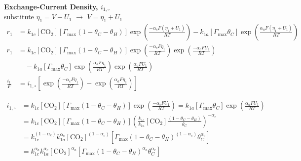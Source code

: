 \documentclass[12pt]{article}
\begin{document}
  \textbf{Exchange-Current Density, $i_{1,\circ}$} \\
  substitute $ \eta_1 = V - U_1$ $\rightarrow$ $ V = \eta_1 + U_1$
  \begin{equation*}
  \begin{split}
    r_1 &= k_{1c} [{\text{CO}_2}] \left[\Gamma_{\max} (1 - \theta_C - \theta_H) \right] \exp{ \left( \frac{-\alpha_c F (\eta_1 + U_1)}{RT} \right)}
    - k_{1a} \left[\Gamma_{\max} \theta_C \right] \exp{\left( \frac{\alpha_a F (\eta_1 + U_1)}{RT} \right)}
    \\
    r_1 &= k_{1c} [{\text{CO}_2}] \left[\Gamma_{\max} (1 - \theta_C - \theta_H) \right] \exp{ \left( \frac{-\alpha_c F \eta_1}{RT} \right)} \exp{ \left( \frac{-\alpha_c F U_1}{RT} \right)} \\
    & \quad - k_{1a} \left[\Gamma_{\max} \theta_C \right] \exp{\left( \frac{\alpha_a F \eta_1}{RT} \right)} \exp{\left( \frac{\alpha_a F U_1}{RT} \right)}
    \\
    \frac{i_1}{F} &= i_{1,\circ} \left[ \exp{\left( \frac{-\alpha_c F \eta_1}{RT} \right)} -\exp{\left( \frac{\alpha_a F \eta_1}{RT} \right)}  \right]
  \end{split}
  \end{equation*}

  \begin{equation*}
  \begin{split}
    i_{1,\circ} &= k_{1c} [{\text{CO}_2}] \left[\Gamma_{\max} (1 - \theta_C - \theta_H) \right] \exp{ \left( \frac{-\alpha_c F U_1}{RT} \right)}
    = k_{1a} \left[\Gamma_{\max} \theta_C \right] \exp{\left( \frac{\alpha_a F U_1}{RT} \right)}
    \\
    & = k_{1c} [{\text{CO}_2}] \left[\Gamma_{\max} (1 - \theta_C - \theta_H) \right] \left( \frac{k_{1c}}{k_{1a}} [{\text{CO}_2}] \frac{(1 - \theta_C - \theta_H)}{\theta_C} \right)^{-\alpha_c}
    \\
    & = k_{1c}^{(1-\alpha_c)} k_{1a}^{\alpha_c} [{\text{CO}_2}]^{(1-\alpha_c)} \left[\Gamma_{\max} (1 - \theta_C - \theta_H)^{(1-\alpha_c)} \theta_C^{\alpha_c} \right]
    \\
    & = k_{1c}^{\alpha_a} k_{1a}^{\alpha_c} [{\text{CO}_2}]^{\alpha_a} \left[\Gamma_{\max} (1 - \theta_C - \theta_H)^{\alpha_a} \theta_C^{\alpha_c} \right]
    \end{split}
  \end{equation*}
\end{document}
